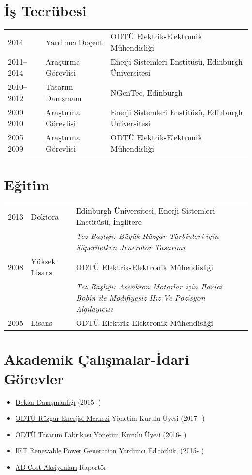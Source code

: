 \documentclass[a4paper,12pt]{article}
\begin{document}
\maketitle

\section{İş Tecrübesi}

\begin{tabular}{lp{3.6cm}l}
2014-- & Yardımcı Doçent & ODTÜ Elektrik-Elektronik Mühendisliği \\
2011--2014 & Araştırma Görevlisi & Enerji Sistemleri Enstitüsü, Edinburgh Üniversitesi \\ 
2010--2012 & Tasarım Danışmanı & NGenTec, Edinburgh\\
2009--2010 & Araştırma Görevlisi & Enerji Sistemleri Enstitüsü, Edinburgh Üniversitesi \\ 
2005--2009 & Araştırma Görevlisi & ODTÜ Elektrik-Elektronik Mühendisliği \\
\end{tabular}

\section{Eğitim}
\begin{tabular}{llp{12cm}}
2013 & Doktora & Edinburgh  Üniversitesi, Enerji Sistemleri Enstitüsü, İngiltere\\  
& & \textit{Tez Başlığı: Büyük Rüzgar Türbinleri için Süperiletken Jenerator Tasarımı} \\ 
2008 & Yüksek Lisans & ODTÜ Elektrik-Elektronik Mühendisliği\\
& & \textit{Tez Başlığı: Asenkron Motorlar için Harici Bobin ile Modifiyesiz Hız Ve Pozisyon Algılayıcısı}\\
2005 & Lisans & ODTÜ Elektrik-Elektronik Mühendisliği \\

\end{tabular}

\section{Akademik Çalışmalar-İdari Görevler}

\begin{itemize}
\item \href{https://muhfd.metu.edu.tr/}{Dekan Danışmanlığı}  (2015- )
\item \href{http://ruzgem.metu.edu.tr/}{ODTÜ Rüzgar Enerjisi Merkezi} Yönetim Kurulu Üyesi (2017- )
\item \href{http://tdi.metu.edu.tr/}{ODTÜ Tasarım Fabrikası} Yönetim Kurulu Üyesi (2016- )
\item \href{http://digital-library.theiet.org/content/journals/iet-rpg}{IET Renewable Power Generation} Yardımcı Editörlük, (2015- )
\item \href{http://www.cost.eu/}{AB Cost Aksiyonları} Raportör
\end{itemize}
\end{document}
